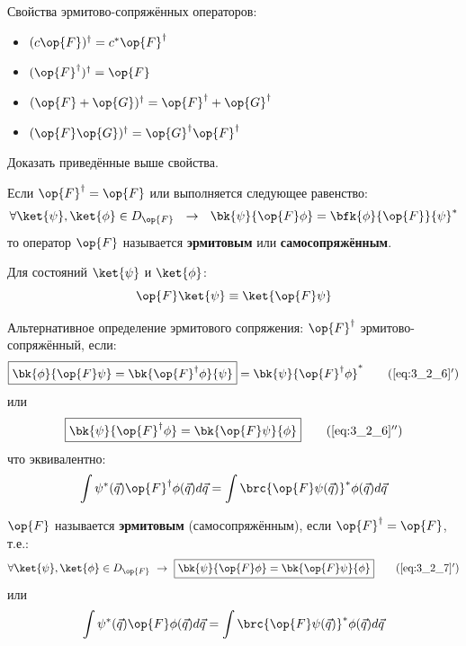 Свойства эрмитово-сопряжённых операторов:
\begin{itemize}
\item $(c\op{F})^\dag = c^* \op{F}^\dag$
\item $(\op{F}^\dag)^\dag = \op{F}$
\item $(\op{F} + \op{G})^\dag = \op{F}^\dag + \op{G}^\dag$
\item $(\op{F}\op{G})^\dag = \op{G}^\dag \op{F}^\dag$
\end{itemize}

\begin{excr}
Доказать приведённые выше свойства.
\end{excr}

\begin{defn}
Если $\op{F}^\dag = \op{F}$ или выполняется следующее равенство:
\begin{equation}
\label{eq:3_2_7}
\forall \ket{\psi},\ket{\phi} \in D_{\op{F}} ~~\to~~  \bk{\psi}{\op{F}\phi} = \bfk{\phi}{\op{F}}{\psi}^*
\end{equation}
то оператор $\op{F}$ называется \textbf{эрмитовым} или \textbf{самосопряжённым}.
\end{defn}

Для состояний $\ket{\psi}$ и $\ket{\phi}$:
$$
\op{F}\ket{\psi} \equiv \ket{\op{F}\psi}
$$

Альтернативное определение эрмитового сопряжения: $\op{F}^\dag$ эрмитово-сопряжённый, если:
\begin{equation}
\label{eq:3_2_6_add}
\boxed{
	\bk{\phi}{\op{F}\psi} = \bk{\op{F}^\dag\phi}{\psi}
} = \bk{\psi}{\op{F}^\dag \phi}^*
\tag{\ref{eq:3_2_6}$'$}
\end{equation}
или
\begin{equation}
\label{eq:3_2_6_add_x2}
\boxed{
	\bk{\psi}{\op{F}^\dag \phi} = \bk{\op{F} \psi}{\phi}
}
\tag{\ref{eq:3_2_6}$''$}
\end{equation}
что эквивалентно:
$$
\int \psi^*(\vec{q}) \op{F}^\dag \phi(\vec{q}) d\vec{q} = \int \brc{\op{F} \psi(\vec{q})}^* \phi(\vec{q}) d\vec{q}
$$

\begin{defn}
$\op{F}$ называется \textbf{эрмитовым} (самосопряжённым), если $\op{F}^\dag = \op{F}$, т.е.:
\begin{equation}
\label{eq:3_2_7_add}
\forall \ket{\psi}, \ket{\phi} \in D_{\op{F}}  ~\to~ \boxed{ \bk{\psi}{\op{F} \phi} = \bk{\op{F}\psi}{\phi} }
\tag{\ref{eq:3_2_7}$'$}
\end{equation}
или
$$
\int \psi^*(\vec{q}) \op{F} \phi(\vec{q}) d\vec{q} = \int \brc{\op{F} \psi(\vec{q})}^* \phi(\vec{q}) d\vec{q}
$$
\end{defn}

